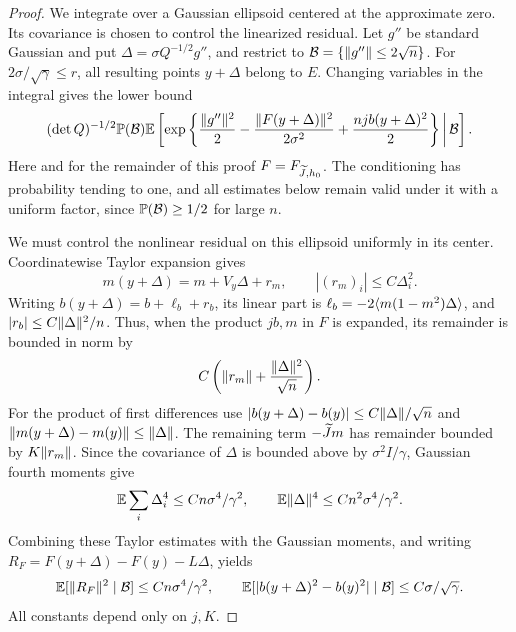 \begin{proof}
We integrate over a Gaussian ellipsoid centered at the approximate
zero. Its covariance is chosen to control the linearized residual.
Let $g''$ be standard Gaussian and put
$\Delta=\sigma Q^{-1/2}g''$, and restrict to
$\mathcal B=\{\lVert g''\rVert\le2\sqrt n\}$.  For
$2\sigma/\sqrt\gamma\le r$, all resulting points $y+\Delta$ belong
to $E$.  Changing variables in the integral gives the lower bound
\begin{equation}
 (\det Q)^{-1/2}\mathbb P(\mathcal B)
 \mathbb E\left[\exp\left\{
 \frac{\lVert g''\rVert^2}{2}
 -\frac{\lVert F(y+\Delta)\rVert^2}{2\sigma^2}
 +\frac{njb(y+\Delta)^2}{2}\right\}\,\middle|\,\mathcal B\right].
 \label{eq:volume-change-variables}
\end{equation}
Here and for the remainder of this proof $F=F_{\widetilde J,h_0}$.
The conditioning has probability tending to one, and all estimates
below remain valid under it with a uniform factor, since
$\mathbb P(\mathcal B)\ge1/2$ for large $n$.

We must control the nonlinear residual on this ellipsoid uniformly
in its center. Coordinatewise Taylor expansion gives
\[
 m(y+\Delta)=m+V_y\Delta+r_m,\qquad
 |(r_m)_i|\le C\Delta_i^2.
\]
Writing $b(y+\Delta)=b+\ell_b+r_b$, its linear part is
$\ell_b=-2\langle m(1-m^2)\Delta\rangle$, and
$|r_b|\le C\lVert \Delta\rVert^2/n$.  Thus, when the product $jb,m$ in
$F$ is expanded, its remainder is bounded in norm by
\[
 C\left(\lVert r_m\rVert+\frac{\lVert \Delta\rVert^2}{\sqrt n}\right).
\]
For the product of first differences use
$|b(y+\Delta)-b(y)|\le C\lVert \Delta\rVert/\sqrt n$ and
$\lVert m(y+\Delta)-m(y)\rVert\le\lVert \Delta\rVert$.  The remaining term
$-\widetilde Jm$ has remainder bounded by $K\lVert r_m\rVert$.
Since the covariance of $\Delta$ is bounded above by
$\sigma^2I/\gamma$, Gaussian fourth moments give
\[
 \mathbb E\sum_i\Delta_i^4\le Cn\sigma^4/\gamma^2,\qquad
 \mathbb E\lVert \Delta\rVert^4\le Cn^2\sigma^4/\gamma^2.
\]
Combining these Taylor estimates with the Gaussian moments, and writing
$R_F=F(y+\Delta)-F(y)-L\Delta$, yields
\begin{equation}
 \mathbb E[\lVert R_F\rVert^2\mid\mathcal B]
 \le Cn\sigma^4/\gamma^2,\qquad
 \mathbb E[|b(y+\Delta)^2-b(y)^2|\mid\mathcal B]
 \le C\sigma/\sqrt\gamma.
 \label{eq:volume-remainders}
\end{equation}
All constants depend only on $j,K$.


\end{proof}
